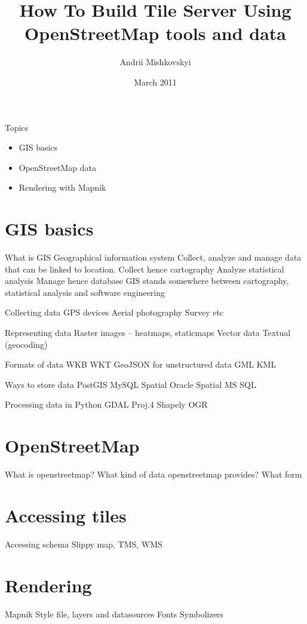 \documentclass{beamer}
\begin{document}
\title{How To Build Tile Server Using OpenStreetMap tools and data}
\author{Andrii Mishkovskyi}
\date{March 2011}

\maketitle

\begin{frame}{Topics}
  \begin{itemize}
  \item GIS basics
  \item OpenStreetMap data
  \item Rendering with Mapnik
  \end{itemize}
\end{frame}

\section{GIS basics}

\begin{frame}{What is GIS}
  Geographical information system
  Collect, analyze and manage data that can be linked to location.
  Collect hence cartography
  Analyze statistical analysis
  Manage hence database
  GIS stands somewhere between cartography, statistical analysis and software engineering
\end{frame}

\begin{frame}{Collecting data}
  GPS devices
  Aerial photography
  Survey
  etc
\end{frame}

\begin{frame}{Representing data}
  Raster images -- heatmaps, staticmaps
  Vector data
  Textual (geocoding)
\end{frame}

\begin{frame}{Formats of data}
  WKB
  WKT
  GeoJSON for unstructured data
  GML
  KML
\end{frame}

\begin{frame}{Ways to store data}
  PostGIS
  MySQL Spatial
  Oracle Spatial
  MS SQL
\end{frame}

\begin{frame}{Processing data in Python}
  GDAL
  Proj.4
  Shapely
  OGR
\end{frame}


\section{OpenStreetMap}

What is openstreetmap?
What kind of data openstreetmap provides?
What form



\section{Accessing tiles}

Accessing schema
Slippy map, TMS, WMS

\section{Rendering}

Mapnik
Style file, layers and datasources
Fonts
Symbolizers
\end{document}
